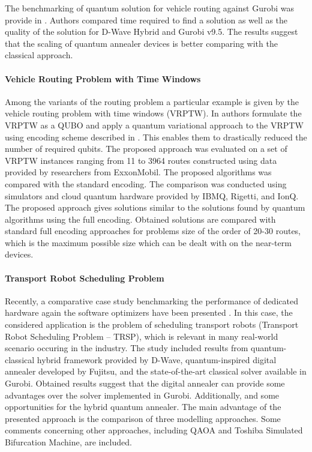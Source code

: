 \documentclass[a4paper,11pt]{article}
\begin{document}
The benchmarking of quantum solution for vehicle routing against Gurobi was provide in \cite{anil2022performance}. Authors compared time required to find a solution as well as the quality of the solution for D-Wave Hybrid and  Gurobi v9.5. The results suggest that the scaling of quantum annealer devices is better comparing with the classical approach.


\paragraph{Vehicle Routing Problem with Time Windows}
Among the variants of the routing problem a particular example is given by the
vehicle routing problem with time windows (VRPTW). In \cite{leonidas2023qubit} authors formulate the VRPTW as a QUBO and apply a quantum variational approach to the VRPTW using encoding scheme described in \cite{vikstaal2020applying}. This enables them to drastically reduced the number of required qubits. The proposed approach was evaluated on a set of VRPTW instances ranging from 11 to 3964 routes constructed using data provided by researchers from ExxonMobil. The proposed algorithms was compared with the standard encoding. The comparison was conducted using simulators and cloud quantum hardware provided by IBMQ, Rigetti, and IonQ. The proposed approach gives solutions similar to the solutions found by quantum algorithms using the full encoding. Obtained solutions are compared with standard full encoding approaches for problems size  of the order of 20-30 routes, which is the maximum possible size which can be dealt with on the near-term devices.


\paragraph{Transport Robot Scheduling Problem} Recently, a comparative case study benchmarking the performance of dedicated hardware again the software optimizers have been presented \cite{leib2023quantum}. In this case, the considered application is the problem of scheduling transport robots (Transport Robot Scheduling Problem -- TRSP), which is relevant in many real-world scenario occuring in the industry. The study included results from quantum-classical hybrid framework provided by D-Wave, quantum-inspired digital annealer developed by Fujitsu, and the state-of-the-art classical solver available in Gurobi. Obtained results suggest that the digital annealer can provide some advantages over the solver implemented in Gurobi.  Additionally,  and some opportunities for the hybrid quantum annealer. The main advantage of the presented approach is the comparison of three modelling approaches. Some comments concerning other approaches, including QAOA and Toshiba Simulated Bifurcation Machine, are included.
\end{document}
